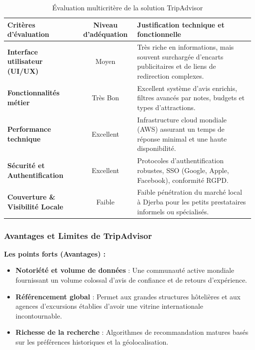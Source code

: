 \documentclass[12pt,a4paper]{report}
\begin{document}
\begin{table}[htbp]
\centering
\caption{Évaluation multicritère de la solution TripAdvisor}
\label{tab:evaluation_tripadvisor}
\vspace{0.3cm}
\begin{tabularx}{\textwidth}{lcp{8cm}}
\toprule
\textbf{Critères d'évaluation} & \textbf{Niveau d'adéquation} & \textbf{Justification technique et fonctionnelle} \\
\midrule
\textbf{Interface utilisateur (UI/UX)} & Moyen & Très riche en informations, mais souvent surchargée d'encarts publicitaires et de liens de redirection complexes. \\
\midrule
\textbf{Fonctionnalités métier} & Très Bon & Excellent système d’avis enrichis, filtres avancés par notes, budgets et types d'attractions. \\
\midrule
\textbf{Performance technique} & Excellent & Infrastructure cloud mondiale (AWS) assurant un temps de réponse minimal et une haute disponibilité. \\
\midrule
\textbf{Sécurité et Authentification} & Excellent & Protocoles d'authentification robustes, SSO (Google, Apple, Facebook), conformité RGPD. \\
\midrule
\textbf{Couverture \& Visibilité Locale} & Faible & Faible pénétration du marché local à Djerba pour les petits prestataires informels ou spécialisés. \\
\bottomrule
\end{tabularx}
\end{table}

\subsubsection{Avantages et Limites de TripAdvisor}

\noindent\textbf{Les points forts (Avantages) :}
\begin{itemize}[label=\checkmark]
    \item \textbf{Notoriété et volume de données} : Une communauté active mondiale fournissant un volume colossal d'avis de confiance et de retours d'expérience.
    \item \textbf{Référencement global} : Permet aux grandes structures hôtelières et aux agences d'excursions établies d'avoir une vitrine internationale incontournable.
    \item \textbf{Richesse de la recherche} : Algorithmes de recommandation matures basés sur les préférences historiques et la géolocalisation.
\end{itemize}
\end{document}
